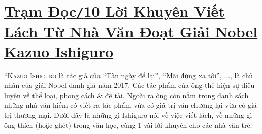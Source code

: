 \documentclass[oneside]{book}
\numberwithin{equation}{section}
\begin{document}

\section{\href{http://www.tramdoc.vn/tin-tuc/muoi-loi-khuyen-viet-lach-tu-nha-van-doat-giai-nobel-kazuo-ishiguro-n95AxW.html?fbclid=IwAR0rfLQU9Y0lB9vRdZ7LpsKl5z_l_2SMS5i5bLBxOzWn6hIr8yMWNMnFM00}{Trạm Đọc\texttt{/}10 Lời Khuyên Viết Lách Từ Nhà Văn Đoạt Giải Nobel Kazuo Ishiguro}}
``\textsc{Kazuo Ishiguro} là tác giả của ``Tàn ngày để lại'', ``Mãi đừng xa tôi'', $\ldots$, là chủ nhân của giải Nobel danh giá năm 2017. Các tác phẩm của ông thể hiện sự điêu luyện về thể loại, phong cách \& đề tài. Ngoài ra ông còn nằm trong danh sách những nhà văn hiếm có viết ra tác phẩm vừa có giá trị văn chương lại vừa có giá trị thương mại. Dưới đây là những gì Ishiguro nói về việc viết lách, về những gì ông thích (hoặc ghét) trong văn học, cùng 1 vài lời khuyên cho các nhà văn trẻ.
\end{document}
